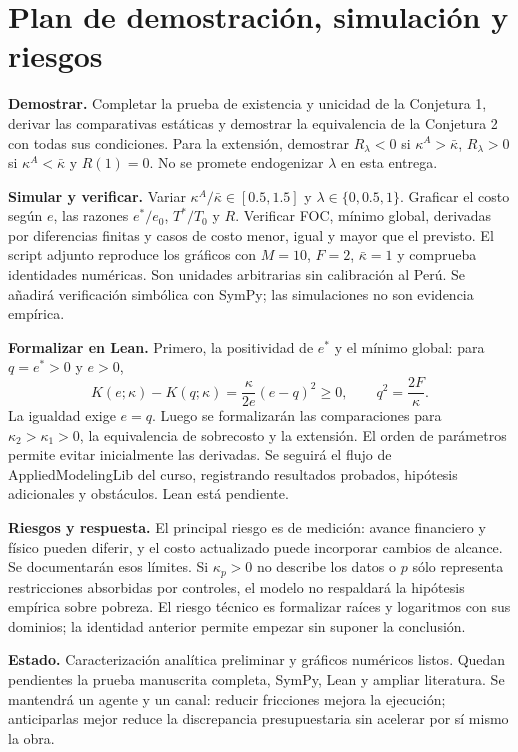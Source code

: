 \documentclass[11pt,a4paper]{article}
\begin{document}
\section{Plan de demostración, simulación y riesgos}
\textbf{Demostrar.} Completar la prueba de existencia y unicidad de la Conjetura 1, derivar las comparativas estáticas y demostrar la equivalencia de la Conjetura 2 con todas sus condiciones. Para la extensión, demostrar $R_\lambda<0$ si $\kappa^A>\bar\kappa$, $R_\lambda>0$ si $\kappa^A<\bar\kappa$ y $R(1)=0$. No se promete endogenizar $\lambda$ en esta entrega.

\textbf{Simular y verificar.} Variar $\kappa^A/\bar\kappa\in[0.5,1.5]$ y $\lambda\in\{0,0.5,1\}$. Graficar el costo según $e$, las razones $e^*/e_0$, $T^*/T_0$ y $R$. Verificar FOC, mínimo global, derivadas por diferencias finitas y casos de costo menor, igual y mayor que el previsto. El script adjunto reproduce los gráficos con $M=10$, $F=2$, $\bar\kappa=1$ y comprueba identidades numéricas. Son unidades arbitrarias sin calibración al Perú. Se añadirá verificación simbólica con SymPy; las simulaciones no son evidencia empírica.

\textbf{Formalizar en Lean.} Primero, la positividad de $e^*$ y el mínimo global: para $q=e^*>0$ y $e>0$,
\begin{equation}
K(e;\kappa)-K(q;\kappa)=\frac{\kappa}{2e}(e-q)^2\geq0,
\qquad q^2=\frac{2F}{\kappa}.
\end{equation}
La igualdad exige $e=q$. Luego se formalizarán las comparaciones para $\kappa_2>\kappa_1>0$, la equivalencia de sobrecosto y la extensión. El orden de parámetros permite evitar inicialmente las derivadas. Se seguirá el flujo de AppliedModelingLib del curso, registrando resultados probados, hipótesis adicionales y obstáculos. Lean está pendiente.

\textbf{Riesgos y respuesta.} El principal riesgo es de medición: avance financiero y físico pueden diferir, y el costo actualizado puede incorporar cambios de alcance. Se documentarán esos límites. Si $\kappa_p>0$ no describe los datos o $p$ sólo representa restricciones absorbidas por controles, el modelo no respaldará la hipótesis empírica sobre pobreza. El riesgo técnico es formalizar raíces y logaritmos con sus dominios; la identidad anterior permite empezar sin suponer la conclusión.

\textbf{Estado.} Caracterización analítica preliminar y gráficos numéricos listos. Quedan pendientes la prueba manuscrita completa, SymPy, Lean y ampliar literatura. Se mantendrá un agente y un canal: reducir fricciones mejora la ejecución; anticiparlas mejor reduce la discrepancia presupuestaria sin acelerar por sí mismo la obra.
\end{document}
